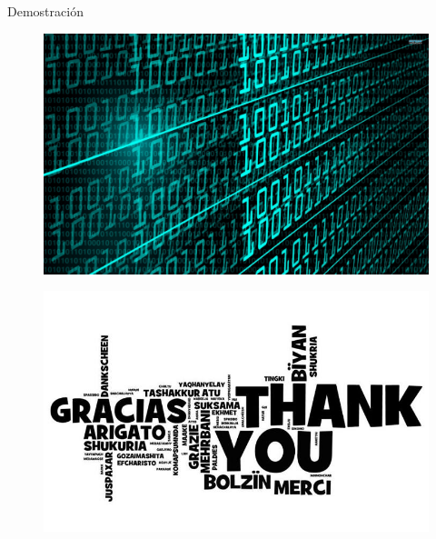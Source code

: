 \documentclass[10pt]{beamer}
\begin{document}
\begin{frame}{Demostración}{}
\begin{block}{}
\begin{figure}[!h]
\begin{center}
\includegraphics[width=.9\textwidth]{./AAUgraphics/code.jpg}
\end{center}
\end{figure}
\end{block}
\end{frame}







\begin{frame}{}{}
\begin{block}{}

\begin{figure}[!h]
\begin{center}
\includegraphics[width=.8\textwidth]{./AAUgraphics/gracias.jpg}
\end{center}
\end{figure}

\end{block}
\end{frame}
\end{document}
